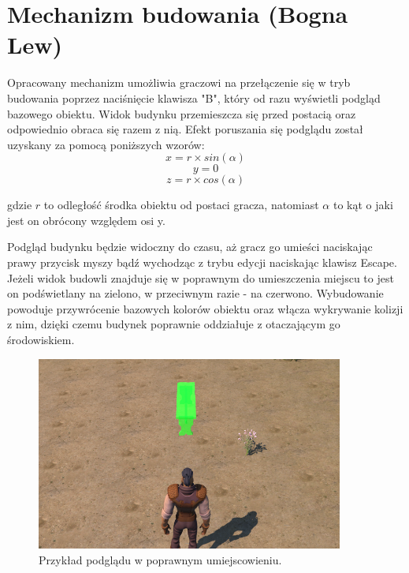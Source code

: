 \section{Mechanizm budowania (Bogna Lew)}

Opracowany mechanizm umożliwia graczowi na przełączenie się w tryb budowania poprzez naciśnięcie klawisza "B", który od razu
wyświetli podgląd bazowego obiektu. Widok budynku przemieszcza się przed postacią oraz odpowiednio obraca się razem z
nią. Efekt poruszania się podglądu został uzyskany za pomocą poniższych wzorów:
\begin{equation}
x = r \times sin(\alpha)
\end{equation}
\begin{equation}
y = 0
\end{equation}
\begin{equation}
z = r \times cos(\alpha)
\end{equation}

gdzie $r$ to odległość środka obiektu od postaci gracza, natomiast $\alpha$ to kąt o jaki jest on obrócony względem osi y.

Podgląd budynku będzie widoczny do czasu, aż gracz go umieści naciskając prawy przycisk myszy bądź wychodząc z trybu
edycji naciskając klawisz Escape. Jeżeli widok budowli znajduje się w poprawnym do umieszczenia miejscu to jest on
podświetlany na zielono, w przeciwnym razie - na czerwono. Wybudowanie powoduje przywrócenie bazowych kolorów obiektu
oraz włącza wykrywanie kolizji z nim, dzięki czemu budynek poprawnie oddziałuje z otaczającym go środowiskiem.

\begin{figure}[h!]
    \centering
    \includegraphics[width=0.9\textwidth]{images/implementacja/mechanizm_budowania/poprawne.png}
    \caption{Przykład podglądu w poprawnym umiejscowieniu.}
\end{figure}

